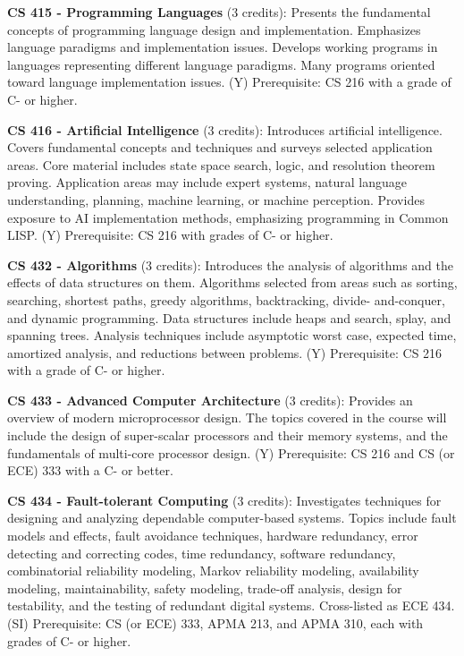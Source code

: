 \documentclass[12pt,twoside]{article}
\begin{document}
{\bf\noindent CS 415 - Programming Languages} (3 credits): Presents
the fundamental concepts of programming language design and
implementation. Emphasizes language paradigms and implementation
issues. Develops working programs in languages representing different
language paradigms. Many programs oriented toward language
implementation issues. (Y) Prerequisite: CS 216 with a grade
of C- or higher.

{\bf\noindent CS 416 - Artificial Intelligence} (3 credits):
Introduces artificial intelligence. Covers fundamental concepts and
techniques and surveys selected application areas. Core material
includes state space search, logic, and resolution theorem
proving. Application areas may include expert systems, natural
language understanding, planning, machine learning, or machine
perception. Provides exposure to AI implementation methods,
emphasizing programming in Common LISP. (Y) Prerequisite: CS 216 with
grades of C- or higher.

{\bf\noindent CS 432 - Algorithms} (3 credits): Introduces the
analysis of algorithms and the effects of data structures on
them. Algorithms selected from areas such as sorting, searching,
shortest paths, greedy algorithms, backtracking, divide- and-conquer,
and dynamic programming. Data structures include heaps and search,
splay, and spanning trees. Analysis techniques include asymptotic
worst case, expected time, amortized analysis, and reductions between
problems. (Y) Prerequisite: CS 216 with a grade of C- or higher.

{\bf\noindent CS 433 - Advanced Computer Architecture} (3 credits):
Provides an overview of modern microprocessor design. The topics
covered in the course will include the design of super-scalar
processors and their memory systems, and the fundamentals of
multi-core processor design. (Y) Prerequisite: CS 216 and CS (or ECE)
333 with a C- or better.

{\bf\noindent CS 434 - Fault-tolerant Computing} (3 credits):
Investigates techniques for designing and analyzing dependable
computer-based systems. Topics include fault models and effects, fault
avoidance techniques, hardware redundancy, error detecting and
correcting codes, time redundancy, software redundancy, combinatorial
reliability modeling, Markov reliability modeling, availability
modeling, maintainability, safety modeling, trade-off analysis, design
for testability, and the testing of redundant digital
systems. Cross-listed as ECE 434. (SI) Prerequisite: CS (or ECE) 333,
APMA 213, and APMA 310, each with grades of C- or higher.
\end{document}
